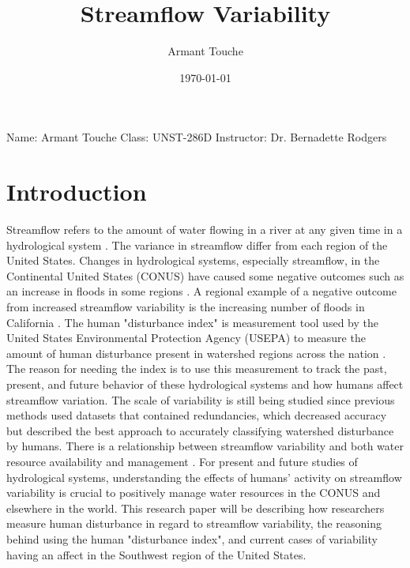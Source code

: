\documentclass[a4paper,man,biblatex]{apa7}
\title{Streamflow Variability}
\author{Armant Touche}
\affiliation{Portland State University}
\date{\today}
\begin{document}
\noindent Name: Armant Touche\newline
\noindent Class: UNST-286D\newline
\noindent Instructor: Dr. Bernadette Rodgers\newline
\section{Introduction} 
\par  Streamflow refers to the amount of water flowing in a river at any given time in a hydrological system \autocite{streamflow_def}. The variance in streamflow differ from each region of the United States. Changes in hydrological systems, especially streamflow, in the Continental United States (CONUS) have caused some negative outcomes such as an increase in floods in some regions \autocite{rice_2016}. A regional example of a negative outcome from increased streamflow variability is the increasing number of floods in California \autocite{standford_2020}. The human "disturbance index" is measurement tool used by the United States Environmental Protection Agency (USEPA) to measure the amount of human disturbance present in watershed regions across the nation \autocite{falcone_2016}. The reason for needing the index is to use this measurement to track the past, present, and future behavior of these hydrological systems and how humans affect streamflow variation. The scale of variability is still being studied since previous methods used datasets that contained redundancies, which decreased accuracy but \textcite{falcone_2016} described the best approach to accurately classifying watershed disturbance by humans. There is a relationship between streamflow variability and both water resource availability and management \autocite{rice_2016}. For present and future studies of hydrological systems, understanding the effects of humans' activity on streamflow variability is crucial to positively manage water resources in the CONUS and elsewhere in the world. This research paper will be describing how researchers measure human disturbance in regard to streamflow variability, the reasoning behind  using the human "disturbance index", and current cases of variability having an affect in the Southwest region of the United States.\\
\end{document}
